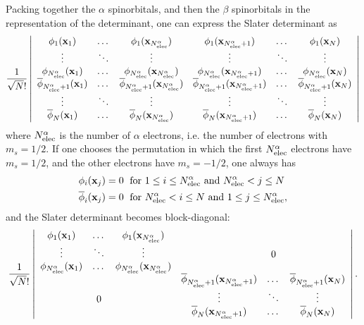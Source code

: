 \documentclass[./thesis.tex]{subfiles}
\begin{document}
Packing together the $\alpha$ spinorbitals, and then the $\beta$ spinorbitals in the representation of
the determinant, one can express the Slater determinant as
\begin{equation}
\frac{1}{\sqrt{N}!} \left|
 \begin{array}{cccccc}
 \phi_1({\bf x}_1)  & \dots & \phi_1({\bf x}_{{N_\text{elec}^\alpha}}) & \phi_1({\bf x}_{{N_\text{elec}^\alpha}+1}) & \dots & \phi_1({\bf x}_{N}) \\
 \vdots             & \ddots& \vdots                    & \vdots                      &\ddots & \vdots  \\         
 \phi_{{N_\text{elec}^\alpha}}({\bf x}_1)  & \dots & \phi_{{N_\text{elec}^\alpha}}({\bf x}_{{N_\text{elec}^\alpha}}) & \phi_{{N_\text{elec}^\alpha}}({\bf x}_{{N_\text{elec}^\alpha}+1}) & \dots & \phi_{{N_\text{elec}^\alpha}}({\bf x}_{N}) \\
 \overline{\phi}_{{N_\text{elec}^\alpha}+1}({\bf x}_1)  & \dots & \overline{\phi}_{{N_\text{elec}^\alpha}+1}({\bf x}_{{N_\text{elec}^\alpha}}) & \overline{\phi}_{{N_\text{elec}^\alpha}+1}({\bf x}_{{N_\text{elec}^\alpha}+1}) & \dots & \overline{\phi}_{{N_\text{elec}^\alpha}+1}({\bf x}_{N}) \\
 \vdots             & \ddots& \vdots                    & \vdots                      &\ddots & \vdots  \\         
 \overline{\phi}_{N}({\bf x}_1)  & \dots & \overline{\phi}_{N}({\bf x}_{{N_\text{elec}^\alpha}}) & \overline{\phi}_{N}({\bf x}_{{N_\text{elec}^\alpha}+1}) & \dots & \overline{\phi}_{N}({\bf x}_{N}) \\
 \end{array}
\right| 
\end{equation}
where ${N_\text{elec}^\alpha}$ is the number of $\alpha$ electrons, i.e. the number of electrons with $m_s=1/2$.
If one chooses the permutation in which the first ${N_\text{elec}^\alpha}$ electrons have $m_s=1/2$, and the other electrons have $m_s=-1/2$, one always has
\begin{align}
\phi_i(\mathbf{x}_j) & = 0 \; \text{ for } 1 \le i \le {N_\text{elec}^\alpha} \text{ and } {N_\text{elec}^\alpha} < j \le N \\ \nonumber
\overline{\phi}_i(\mathbf{x}_j) & = 0 \; \text{ for }  {N_\text{elec}^\alpha} < i \le N \text{ and }  1 \le j \le {N_\text{elec}^\alpha},
\end{align}
and the Slater determinant becomes block-diagonal:
\begin{equation}
\frac{1}{\sqrt{N}!} \left|
 \begin{array}{cccccc}
 \phi_1({\bf x}_1)  & \dots & \phi_1({\bf x}_{{N_\text{elec}^\alpha}}) &   & &   \\
 \vdots             &\ddots & \vdots                    & &  0    & \\         
 \phi_{{N_\text{elec}^\alpha}}({\bf x}_1)  & \dots & \phi_{{N_\text{elec}^\alpha}}({\bf x}_{{N_\text{elec}^\alpha}}) &   & &   \\
   & & & \overline{\phi}_{{N_\text{elec}^\alpha}+1}({\bf x}_{{N_\text{elec}^\alpha}+1}) & \dots & \overline{\phi}_{{N_\text{elec}^\alpha}+1}({\bf x}_{N}) \\
 & 0 & & \vdots                      &\ddots & \vdots  \\         
   & &   & \overline{\phi}_{N}({\bf x}_{{N_\text{elec}^\alpha}+1}) & \dots & \overline{\phi}_{N}({\bf x}_{N}) \\
 \end{array}
\right|. 
\end{equation}
\end{document}
